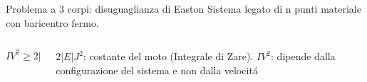\begin{frame}{Problema a 3 corpi: disuguaglianza di Easton}
Sistema legato di n punti materiale con baricentro fermo.
\begin{columns}[T]
\begin{column}{0.5\textwidth}
\begin{equation*}
IV^2\geq2|E|J^2
\end{equation*}
\end{column}
\begin{column}{0.5\textwidth}
$2|E|J^2$: costante del moto (Integrale di Zare).
$IV^2$: dipende dalla configurazione del sistema e non dalla velocit\'a
\end{column}
\end{columns}
\end{frame}
